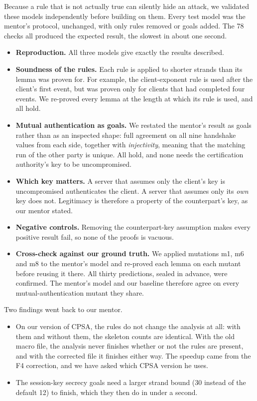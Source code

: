 \documentclass[11pt]{article}
\begin{document}
Because a rule that is not actually true can silently hide an attack, we validated these models independently before building on them. Every test model was the mentor's protocol, unchanged, with only rules removed or goals added. The 78 checks all produced the expected result, the slowest in about one second.
\begin{itemize}
    \item \textbf{Reproduction.} All three models give exactly the results described.
    \item \textbf{Soundness of the rules.} Each rule is applied to shorter strands than its lemma was proven for. For example, the client-exponent rule is used after the client's first event, but was proven only for clients that had completed four events. We re-proved every lemma at the length at which its rule is used, and all hold.
    \item \textbf{Mutual authentication as goals.} We restated the mentor's result as goals rather than as an inspected shape: full agreement on all nine handshake values from each side, together with \textit{injectivity}, meaning that the matching run of the other party is unique. All hold, and none needs the certification authority's key to be uncompromised.
    \item \textbf{Which key matters.} A server that assumes only the client's key is uncompromised authenticates the client. A server that assumes only its \textit{own} key does not. Legitimacy is therefore a property of the counterpart's key, as our mentor stated.
    \item \textbf{Negative controls.} Removing the counterpart-key assumption makes every positive result fail, so none of the proofs is vacuous.
    \item \textbf{Cross-check against our ground truth.} We applied mutations m1, m6 and m8 to the mentor's model and re-proved each lemma on each mutant before reusing it there. All thirty predictions, sealed in advance, were confirmed. The mentor's model and our baseline therefore agree on every mutual-authentication mutant they share.
\end{itemize}

Two findings went back to our mentor.
\begin{itemize}
    \item On our version of CPSA, the rules do not change the analysis at all: with them and without them, the skeleton counts are identical. With the old macro file, the analysis never finishes whether or not the rules are present, and with the corrected file it finishes either way. The speedup came from the F4 correction, and we have asked which CPSA version he uses.
    \item The session-key secrecy goals need a larger strand bound (30 instead of the default 12) to finish, which they then do in under a second.
\end{itemize}
\end{document}
